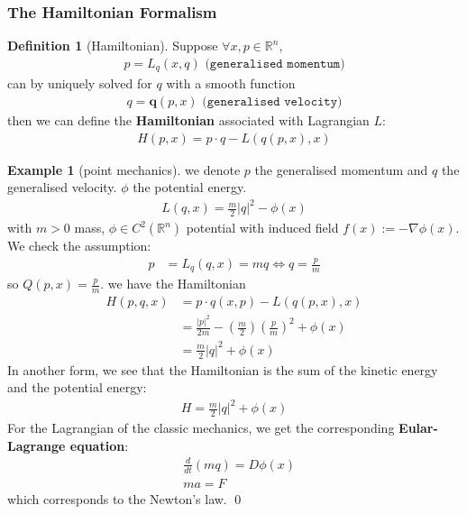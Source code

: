 \documentclass[a4paper,11pt,oneside,fleqn]{book}
\theoremstyle{definition}
\newtheorem{definition}{Definition}[section]
\newtheorem*{example}{Example}
\theoremstyle{remark}
\begin{document}
\subsubsection{The Hamiltonian Formalism}
\begin{definition}[Hamiltonian]
Suppose $\forall x, p \in \mathbb{R}^n$, 
\begin{align*}
	p= L_q(x, q) \texttt{ (generalised momentum)}
\end{align*}
can by uniquely solved for $q$ with a smooth function 
\begin{align*}
	q = \textbf{q}(p, x) \texttt{ (generalised velocity)}
\end{align*}
then we can define the \textbf{Hamiltonian} associated with Lagrangian $L$:
	\begin{align*}
		H(p, x) = p \cdot q - L(q(p, x) , x)
	\end{align*}
\end{definition} 

\begin{example}[point mechanics]
we denote $p$ the generalised momentum and $q$ the generalised velocity. $\phi$ the potential energy.
\begin{align*}
	L(q, x) = \frac{m}{2}|q|^2 - \phi(x)
\end{align*}	
with $m > 0$ mass, $\phi \in C^2(\mathbb{R}^n)$ potential with induced field $f(x):= -\nabla \phi(x)$. We check the assumption:
\begin{align*}
	p &= L_q(q, x) = mq \Leftrightarrow q = \frac{p}{m}
\end{align*}
so $Q(p, x) = \frac{p}{m}$. we have the Hamiltonian
\begin{align*}
	H(p, q, x) &= p \cdot q(x, p) - L(q(p, x), x)\\
	&=  \frac{|p|^2}{2 m }  - (\frac{m}{2}) (\frac{p}{m})^2 + \phi(x)\\
	&= \frac{m}{2} |q|^2 + \phi(x)
\end{align*}
In another form, we see that the Hamiltonian is the sum of the kinetic energy and the potential energy:
\begin{align*}
	H = \frac{m}{2} |q|^2 + \phi(x)
\end{align*}
For the Lagrangian of the classic mechanics, we get the corresponding \textbf{Eular-Lagrange equation}:
\begin{align*}
	&\frac{d}{dt}(mq) = D \phi(x)\\
	&ma = F
\end{align*}
which corresponds to the Newton's law.  \qed
\end{example}
\end{document}
